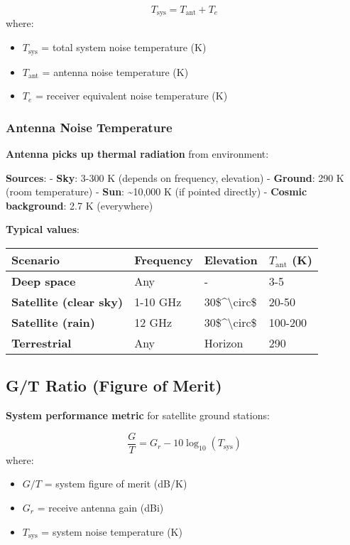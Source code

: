 \begin{equation}
T_{\text{sys}} = T_{\text{ant}} + T_e
\end{equation}
where:
\begin{itemize}
\item $T_{\text{sys}}$ = total system noise temperature (K)
\item $T_{\text{ant}}$ = antenna noise temperature (K)
\item $T_e$ = receiver equivalent noise temperature (K)
\end{itemize}

\subsubsection{Antenna Noise
Temperature}\label{antenna-noise-temperature}

\textbf{Antenna picks up thermal radiation} from environment:

\textbf{Sources}: - \textbf{Sky}: 3-300 K (depends on frequency,
elevation) - \textbf{Ground}: 290 K (room temperature) - \textbf{Sun}:
\textasciitilde10,000 K (if pointed directly) - \textbf{Cosmic
background}: 2.7 K (everywhere)

\textbf{Typical values}:

{\def\LTcaptype{} %
\begin{longtable}[]{@{}llll@{}}
\toprule\noalign{}
Scenario & Frequency & Elevation & \(T_{\text{ant}}\) (K) \\
\midrule\noalign{}
\endhead
\bottomrule\noalign{}
\endlastfoot
\textbf{Deep space} & Any & - & 3-5 \\
\textbf{Satellite (clear sky)} & 1-10 GHz &
30\$\^{}\textbackslash circ\$ & 20-50 \\
\textbf{Satellite (rain)} & 12 GHz & 30\$\^{}\textbackslash circ\$ &
100-200 \\
\textbf{Terrestrial} & Any & Horizon & 290 \\
\end{longtable}
}

\subsection{G/T Ratio (Figure of Merit)}

\textbf{System performance metric} for satellite ground stations:

\begin{equation}
\frac{G}{T} = G_r - 10\log_{10}(T_{\text{sys}})
\end{equation}
where:
\begin{itemize}
\item $G/T$ = system figure of merit (dB/K)
\item $G_r$ = receive antenna gain (dBi)
\item $T_{\text{sys}}$ = system noise temperature (K)
\end{itemize}

